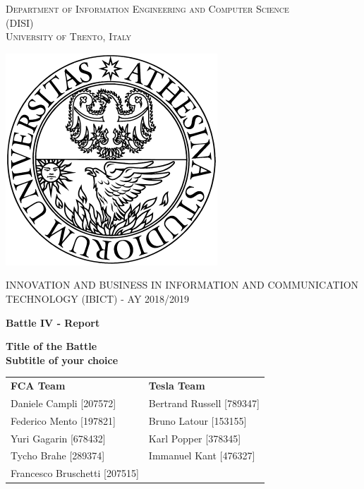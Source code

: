 \begin{titlepage}
	\begin{center}
   	{\scshape\LARGE
    	Department of Information Engineering and Computer Science\\ 
      	(DISI)\\ 
      	University of Trento, Italy\\\par}
      	\vspace{1cm}
      	\includegraphics[scale=0.5]{resources/logo}\\
	\vspace{1cm}
	{\scshape\Large INNOVATION AND BUSINESS IN INFORMATION AND COMMUNICATION TECHNOLOGY (IBICT) - AY 2018/2019\par}
	\vspace{1.5cm}
	{\huge\bfseries Battle IV - Report\\\par}
	\vspace{1cm}
	{\Large\bfseries Title of the Battle\\
	Subtitle of your choice\par}
      	\vfill
        \begin{tabular}{ll}
        \textbf{FCA Team}           &       \textbf{Tesla Team}         \\
       	Daniele Campli [207572]     &       Bertrand Russell [789347]   \\
	    Federico Mento [197821]     &       Bruno Latour [153155]       \\
	    Yuri Gagarin [678432]       &       Karl Popper [378345]        \\
	    Tycho Brahe [289374]        &       Immanuel Kant [476327]      \\
	    Francesco Bruschetti [207515]        &           \\
        \end{tabular}
      	\vfill
      	\vfill
	\end{center}
\end{titlepage}
